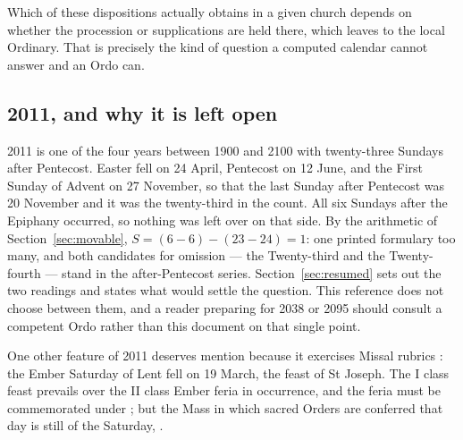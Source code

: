 Which of these dispositions actually obtains in a given church depends on whether the procession
or supplications are held there, which  leaves to the local Ordinary. That is precisely
the kind of question a computed calendar cannot answer and an Ordo can.

\subsection{2011, and why it is left open}

2011 is one of the four years between 1900 and 2100 with twenty-three Sundays after Pentecost.
Easter fell on 24 April, Pentecost on 12 June, and the First Sunday of Advent on 27 November, so
that the last Sunday after Pentecost was 20 November and it was the twenty-third in the count.
All six Sundays after the Epiphany occurred, so nothing was left over on that side. By the
arithmetic of Section~\ref{sec:movable}, $S = (6-6) - (23-24) = 1$: one printed formulary too
many, and both candidates for omission — the Twenty-third and the Twenty-fourth — stand in the
after-Pentecost series. Section~\ref{sec:resumed} sets out the two readings and states what
would settle the question. This reference does not choose between them, and a reader preparing
for 2038 or 2095 should consult a competent Ordo rather than this document on that single point.

One other feature of 2011 deserves mention because it exercises Missal rubrics : the
Ember Saturday of Lent fell on 19 March, the feast of St Joseph. The I class feast prevails over
the II class Ember feria in occurrence, and the feria must be commemorated under ; but the
Mass in which sacred Orders are conferred that day is still of the Saturday, .
